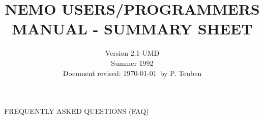 

\title{NEMO USERS/PROGRAMMERS MANUAL - SUMMARY SHEET}

\date{Version 2.1-UMD \\
 Summer 1992 \\
 Document revised: \today\ by P. Teuben}


\setlength{\parindent}{0pt}
\setlength{\parskip}{2.5mm}

\centerline{FREQUENTLY ASKED QUESTIONS (FAQ)}

